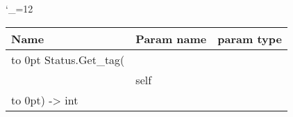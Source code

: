 \begingroup \catcode`\_=12 \tt
\begin{tabular}{lll}
\toprule
\textrm{Name}&\textrm{Param name}&\textrm{param type}\\
\midrule
\hbox to 0pt {Status.Get_tag(\hss}\\
& self\\
\hbox to 0pt{) -> int\hss}\\
\bottomrule
\end{tabular}
\endgroup
